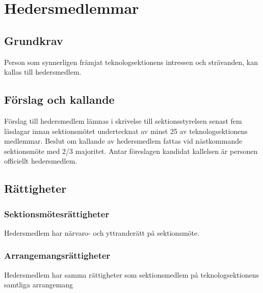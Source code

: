 \section{Hedersmedlemmar}
\label{sec:hedersmedlemmar}

\subsection{Grundkrav}
Person som synnerligen främjat teknologsektionens intressen och strävanden, kan kallas till hedersmedlem.

\subsection{Förslag och kallande}
Förslag till hedersmedlem lämnas i skrivelse till sektionsstyrelsen senast fem läsdagar innan sektionsmötet undertecknat av minst 25 av teknologsektionens medlemmar. Beslut om kallande av hedersmedlem fattas vid nästkommande sektionsmöte med 2/3 majoritet. Antar föreslagen kandidat kallelsen är personen officiellt hedersmedlem.

\subsection{Rättigheter}

\subsubsection{Sektionsmötesrättigheter}
Hedersmedlem har närvaro- och yttranderätt på sektionsmöte.

\subsubsection{Arrangemangsrättigheter}
Hedersmedlem har samma rättigheter som sektionsmedlem på teknologsektionens samtliga arrangemang